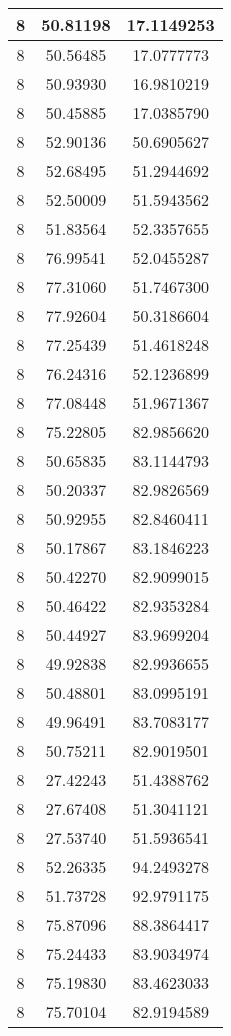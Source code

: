 \documentclass[
]{book}
\begin{document}
\begin{tabular}{c|c|c}
\hline
8 & 50.81198 & 17.1149253\\
\hline
8 & 50.56485 & 17.0777773\\
\hline
8 & 50.93930 & 16.9810219\\
\hline
8 & 50.45885 & 17.0385790\\
\hline
8 & 52.90136 & 50.6905627\\
\hline
8 & 52.68495 & 51.2944692\\
\hline
8 & 52.50009 & 51.5943562\\
\hline
8 & 51.83564 & 52.3357655\\
\hline
8 & 76.99541 & 52.0455287\\
\hline
8 & 77.31060 & 51.7467300\\
\hline
8 & 77.92604 & 50.3186604\\
\hline
8 & 77.25439 & 51.4618248\\
\hline
8 & 76.24316 & 52.1236899\\
\hline
8 & 77.08448 & 51.9671367\\
\hline
8 & 75.22805 & 82.9856620\\
\hline
8 & 50.65835 & 83.1144793\\
\hline
8 & 50.20337 & 82.9826569\\
\hline
8 & 50.92955 & 82.8460411\\
\hline
8 & 50.17867 & 83.1846223\\
\hline
8 & 50.42270 & 82.9099015\\
\hline
8 & 50.46422 & 82.9353284\\
\hline
8 & 50.44927 & 83.9699204\\
\hline
8 & 49.92838 & 82.9936655\\
\hline
8 & 50.48801 & 83.0995191\\
\hline
8 & 49.96491 & 83.7083177\\
\hline
8 & 50.75211 & 82.9019501\\
\hline
8 & 27.42243 & 51.4388762\\
\hline
8 & 27.67408 & 51.3041121\\
\hline
8 & 27.53740 & 51.5936541\\
\hline
8 & 52.26335 & 94.2493278\\
\hline
8 & 51.73728 & 92.9791175\\
\hline
8 & 75.87096 & 88.3864417\\
\hline
8 & 75.24433 & 83.9034974\\
\hline
8 & 75.19830 & 83.4623033\\
\hline
8 & 75.70104 & 82.9194589\\

\end{tabular}
\end{document}
